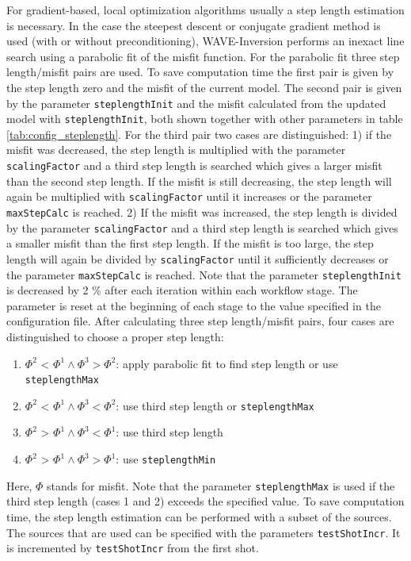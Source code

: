 \documentclass[pdftex,a4paper,parskip,listof=totoc,bibliography=totoc,onehalfspacing,12pt]{scrreprt}
\begin{document}
For gradient-based, local optimization algorithms usually a step length estimation is necessary. In the case the steepest descent or conjugate gradient method is used (with or without preconditioning), WAVE-Inversion performs an inexact line search using a parabolic fit of the misfit function. For the parabolic fit three step length/misfit pairs are used. To save computation time the first pair is given by the step length zero and the misfit of the current model. The second pair is given by the parameter \verb+steplengthInit+ and the misfit calculated from the updated model with \verb+steplengthInit+, both shown together with other parameters in table \ref{tab:config_steplength}. For the third pair two cases are distinguished: 1) if the misfit was decreased, the step length is multiplied with the parameter \verb+scalingFactor+ and a third step length is searched which gives a larger misfit than the second step length. If the misfit is still decreasing, the step length will again be multiplied with \verb+scalingFactor+ until it increases or the parameter \verb+maxStepCalc+ is reached. 2) If the misfit was increased, the step length is divided by the parameter \verb+scalingFactor+ and a third step length is searched which gives a smaller misfit than the first step length. If the misfit is too large, the step length will again be divided by \verb+scalingFactor+ until it sufficiently decreases or the parameter \verb+maxStepCalc+ is reached.
Note that the parameter \verb+steplengthInit+ is decreased by 2 \% after each iteration within each workflow stage. The parameter is reset at the beginning of each stage to the value specified in the configuration file.
After calculating three step length/misfit pairs, four cases are distinguished to choose a proper step length:
\begin{enumerate}
 \item $\Phi^2$ < $\Phi^1 \land \Phi^3 > \Phi^2$: apply parabolic fit to find step length or use \verb+steplengthMax+ 
 \item $\Phi^2$ < $\Phi^1 \land \Phi^3 < \Phi^2$: use third step length or \verb+steplengthMax+
 \item $\Phi^2$ > $\Phi^1 \land \Phi^3 < \Phi^1$: use third step length 
 \item $\Phi^2$ > $\Phi^1 \land \Phi^3 > \Phi^1$: use \verb+steplengthMin+
\end{enumerate}

Here, $\Phi$ stands for misfit. Note that the parameter \verb+steplengthMax+ is used if the third step length (cases 1 and 2) exceeds the specified value.
To save computation time, the step length estimation can be performed with a subset of the sources. The sources that are used can be specified with the parameters \verb+testShotIncr+. It is incremented by \verb+testShotIncr+ from the first shot.
\end{document}
